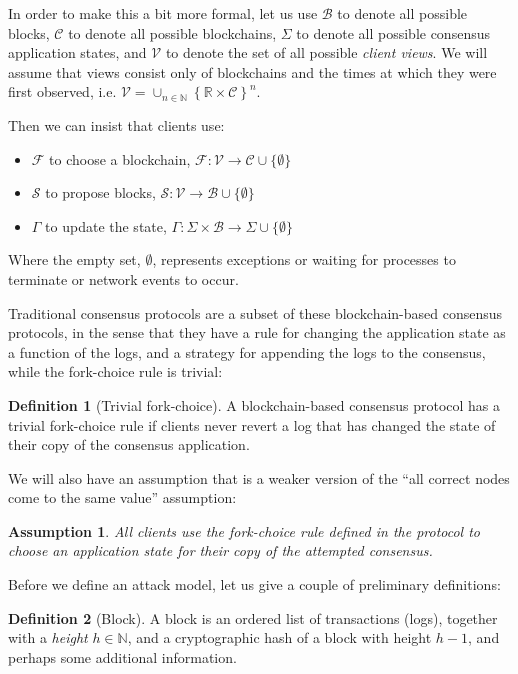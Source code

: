 \documentclass[11pt,a4paper]{article}
\theoremstyle{plain}
\newtheorem{assm}{Assumption}
\theoremstyle{definition}
\newtheorem{defn}{Definition}
\begin{document}
In order to make this a bit more formal, let us use $\mathcal{B}$ to denote all possible blocks, $\mathcal{C}$ to denote all possible blockchains, $\Sigma$ to denote all possible consensus application states, and $\mathcal{V}$ to denote the set of all possible \emph{client views}. We will assume that views consist only of blockchains and the times at which they were first observed, i.e. $\mathcal{V} = \cup_{n \in \mathbb{N}}\left\{\mathbb{R} \times \mathcal{C}\right\}^n$.

Then we can insist that clients use:
\begin{itemize}
\item $\mathcal{F}$ to choose a blockchain, $\mathcal{F}:\mathcal{V} \to \mathcal{C} \cup \{\emptyset \}$
\item $\mathcal{S}$ to propose blocks, $\mathcal{S}: \mathcal{V} \to \mathcal{B} \cup \{\emptyset \}$
\item $\Gamma$ to update the state, $\Gamma: \Sigma \times \mathcal{B} \to \Sigma \cup \{\emptyset \}$
\end{itemize}

Where the empty set, $\emptyset$, represents exceptions or waiting for processes to terminate or network events to occur.

Traditional consensus protocols are a subset of these blockchain-based consensus protocols, in the sense that they have a rule for changing the application state as a function of the logs, and a strategy for appending the logs to the consensus, while the fork-choice rule is trivial:

\begin{defn}[Trivial fork-choice]
A blockchain-based consensus protocol has a trivial fork-choice rule if clients never revert a log that has changed the state of their copy of the consensus application.
\end{defn}

We will also have an assumption that is a weaker version of the ``all correct nodes come to the same value'' assumption:

\begin{assm}
All clients use the fork-choice rule defined in the protocol to choose an application state for their copy of the attempted consensus.
\end{assm}

Before we define an attack model, let us give a couple of preliminary definitions:

\begin{defn}[Block]
A block is an ordered list of transactions (logs), together with a \emph{height} $h \in \mathbb{N}$, and a cryptographic hash of a block with height $h - 1$, and perhaps some additional information. 
\end{defn}
\end{document}
